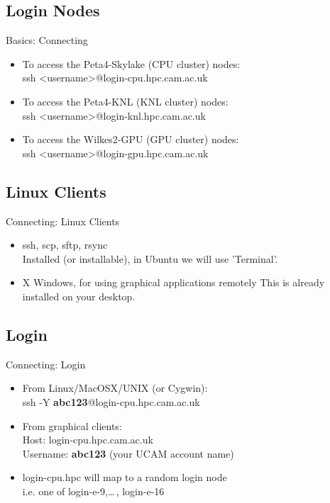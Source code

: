 \subsection{Login Nodes}
\begin{frame}{Basics: Connecting}
\begin{itemize}
\item To access the Peta4-Skylake (CPU cluster) nodes:\hfill\\
{ ssh \textless username\textgreater @login-cpu.hpc.cam.ac.uk}
\item To access the Peta4-KNL (KNL cluster) nodes:\hfill\\
ssh \textless username\textgreater @login-knl.hpc.cam.ac.uk
\item To access the Wilkes2-GPU (GPU cluster) nodes:\hfill\\
ssh \textless username\textgreater @login-gpu.hpc.cam.ac.uk
\end{itemize}
\end{frame}

\subsection{Linux Clients}
\begin{frame}{Connecting: Linux Clients}
\begin{itemize}
\item {\color<2->{red}ssh}, scp, sftp, {rsync}\hfill\\
\alert{\small Installed (or installable), in Ubuntu we will use 'Terminal'.}
\item {X Windows, for using graphical applications remotely}
\alert{\small This is already installed on your desktop.}
\end{itemize}
\end{frame}

\subsection{Login}
\begin{frame}{Connecting: Login}
\begin{itemize}
\item From Linux/MacOSX/UNIX (or Cygwin):\hfill\\
\alert{ssh -Y \textbf{abc123}@login-cpu.hpc.cam.ac.uk}
\pause
\item From graphical clients:\hfill\\
Host: \alert{login-cpu.hpc.cam.ac.uk}\hfill\\
Username: \alert{\textbf{abc123}} (your UCAM account name)
\pause
\item login-cpu.hpc will map to a random login node\hfill\\
\alert{i.e. one of login-e-9,\ldots\,, login-e-16}\hfill\\
\end{itemize}
\end{frame}

